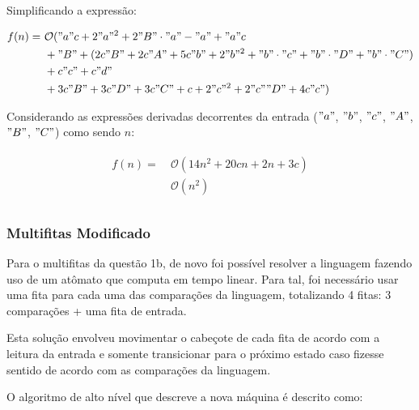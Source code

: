 \documentclass{article}
\begin{document}
Simplificando a expressão:

\begin{align}
  \begin{split}
    f(n) =\ &{} \mathcal{O}("a"c + 2"a"^2 + 2"B"\cdot "a" - "a" + "a"c \\
            & +"B" +(2c"B" + 2c"A" + 5c"b" + 2"b"^2 + "b" \cdot "c" + "b" \cdot "D" + "b" \cdot "C") \\
            & + c"c" + c"d"\\
            & + 3c"B" + 3c"D" + 3c"C" + c + 2"c"^2 + 2"c""D" + 4c"c")\\
\end{split}
\end{align}

Considerando as expressões derivadas decorrentes da entrada ($"a"$, $"b"$, $"c"$, $"A"$, $"B"$, $"C"$) como sendo $n$:

\begin{align}
  \begin{split}
    f(n) =\ &{} \mathcal{O}(14n^2 + 20cn + 2n + 3c)\\
          \ &{} \mathcal{O}(n^2)\\
\end{split}
\end{align}

\subsubsection{ Multifitas Modificado }
Para o multifitas da questão 1b, de novo foi possível resolver a linguagem
fazendo uso de um atômato que computa em tempo linear. Para tal, foi necessário
usar uma fita para cada uma das comparações da linguagem, totalizando 4 fitas:
3 comparações + uma fita de entrada.

Esta solução envolveu movimentar o cabeçote de cada fita de acordo com a
leitura da entrada e somente transicionar para o próximo estado caso fizesse
sentido de acordo com as comparações da linguagem.

O algoritmo de alto nível que descreve a nova máquina é descrito como:
\end{document}
